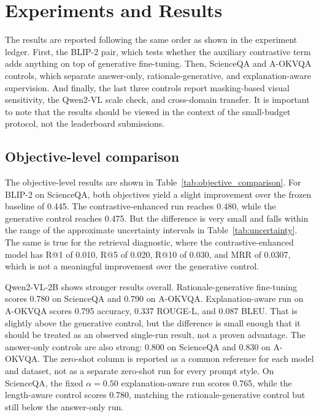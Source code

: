 \documentclass[12pt,bibliography=totoc,listof=totoc,BCOR=5mm,DIV=12,oneside,open=any]{scrbook}
\begin{document}
\FloatBarrier
\chapter{Experiments and Results}
The results are reported following the same order as shown in the experiment ledger.
First, the BLIP-2 pair, which tests whether the auxiliary contrastive term adds anything on top of generative fine-tuning.
Then, ScienceQA and A-OKVQA controls, which separate answer-only, rationale-generative, and explanation-aware supervision.
And finally, the last three controls report masking-based visual sensitivity, the Qwen2-VL scale check, and cross-domain transfer.
It is important to note that the results should be viewed in the context of the small-budget protocol, not the leaderboard submissions.

\section{Objective-level comparison}
The objective-level results are shown in Table~\ref{tab:objective_comparison}.
For BLIP-2 on ScienceQA, both objectives yield a slight improvement over the frozen baseline of 0.445.
The contrastive-enhanced run reaches 0.480, while the generative control reaches 0.475.
But the difference is very small and falls within the range of the approximate uncertainty intervals in Table~\ref{tab:uncertainty}.
The same is true for the retrieval diagnostic, where the contrastive-enhanced model has R@1 of 0.010, R@5 of 0.020, R@10 of 0.030, and MRR of 0.0307, which is not a meaningful improvement over the generative control.

Qwen2-VL-2B shows stronger results overall.
Rationale-generative fine-tuning scores 0.780 on ScienceQA and 0.790 on A-OKVQA.
Explanation-aware run on A-OKVQA scores 0.795 accuracy, 0.337 ROUGE-L, and 0.087 BLEU.
That is slightly above the generative control, but the difference is small enough that it should be treated as an observed single-run result, not a proven advantage.
The answer-only controls are also strong: 0.800 on ScienceQA and 0.830 on A-OKVQA.
The zero-shot column is reported as a common reference for each model and dataset, not as a separate zero-shot run for every prompt style.
On ScienceQA, the fixed $\alpha=0.50$ explanation-aware run scores 0.765, while the length-aware control scores 0.780, matching the rationale-generative control but still below the answer-only run.
\end{document}
